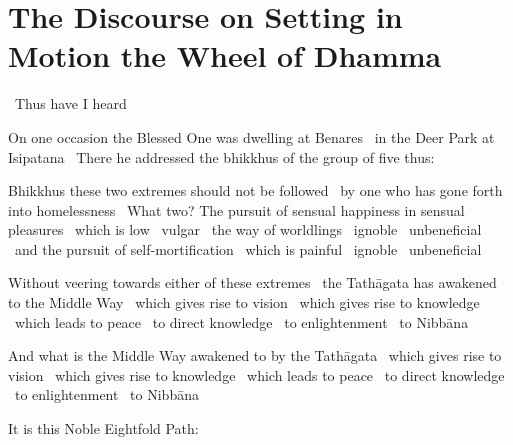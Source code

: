 
\section{The Discourse on Setting in Motion the Wheel of Dhamma}
\label{wheel-of-dhamma-full}

\begin{leader-english}
  \anglebracketleft\ \hspace{-0.5mm}Thus have I heard \hspace{-0.5mm}\anglebracketright\
\end{leader-english}

\begin{english-only-hang}
  On one occasion the Blessed One was dwelling at Benares \breathmark\ in the Deer Park at Isipatana \breathmark\ There he addressed the bhikkhus of the group of five thus:
\end{english-only-hang}

\begin{english-only-hang}
  Bhikkhus these two extremes should not be followed \breathmark\ by one who has gone forth into homelessness \breathmark\ What two? The pursuit of sensual happiness in sensual pleasures \breathmark\ which is low \breathmark\ vulgar \breathmark\ the way of worldlings \breathmark\ ignoble \breathmark\ unbeneficial \breathmark\ and the pursuit of self-mortification \breathmark\ which is painful \breathmark\ ignoble \breathmark\ unbeneficial
\end{english-only-hang}

\begin{english-only-hang}
  Without veering towards either of these extremes \breathmark\ the Tathāgata has awakened to the Middle Way \breathmark\ which gives rise to vision \breathmark\ which gives rise to knowledge \breathmark\ which leads to peace \breathmark\ to direct knowledge \breathmark\ to enlightenment \breathmark\ to Nibbāna
\end{english-only-hang}

\begin{english-only-hang}
  And what is the Middle Way awakened to by the Tathāgata \breathmark\ which gives rise to vision \breathmark\ which gives rise to knowledge \breathmark\ which leads to peace \breathmark\ to direct knowledge \breathmark\ to enlightenment \breathmark\ to Nibbāna
\end{english-only-hang}

\begin{english-only-hang}
  It is this Noble Eightfold Path:
\end{english-only-hang}

